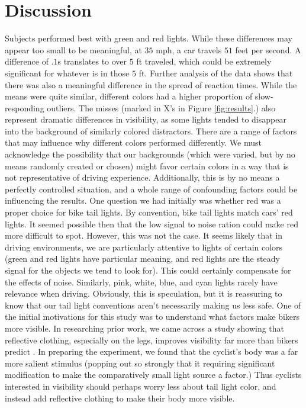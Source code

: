 \section{Discussion}

Subjects performed best with green and red lights. While these differences may
appear too small to be meaningful, at $35$ mph, a car travels $51$ feet per
second. A difference of $.1$s translates to over $5$ ft traveled, which could
be extremely significant for whatever is in those $5$ ft.  Further analysis of
the data shows that there was also a meaningful difference in the spread of
reaction times. While the means were quite similar, different colors had a
higher proportion of slow-responding outliers. The misses (marked in X's in
Figure \ref{fig:results}.) also represent dramatic differences in visibility,
as some lights tended to disappear into the background of similarly colored
distractors.  There are a range of factors that may influence why different
colors performed differently. We must acknowledge the possibility that our
backgrounds (which were varied, but by no means randomly created or chosen)
might favor certain colors in a way that is not representative of driving
experience. Additionally, this is by no means a perfectly controlled situation,
and a whole range of confounding factors could be influencing the results.  One
question we had initially was whether red was a proper choice for bike tail
lights. By convention, bike tail lights match cars' red lights. It seemed
possible then that the low signal to noise ration could make red more difficult
to spot. However, this was not the case. It seems likely that in driving
environments, we are particularly attentive to lights of certain colors (green
and red lights have particular meaning, and red lights are the steady signal
for the objects we tend to look for). This could certainly compensate for the
effects of noise. Similarly, pink, white, blue, and cyan lights rarely have
relevance when driving. Obviously, this is speculation, but it is reassuring to
know that our tail light conventions aren't necessarily making us less safe.
One of the initial motivations for this study was to understand what factors
make bikers more visible. In researching prior work, we came across a study
showing that reflective clothing, especially on the legs, improves visibility
far more than bikers predict \cite{wood2013bicyclists}. In preparing the
experiment, we found that the cyclist's body was a far more salient stimulus
(popping out so strongly that it requiring significant modification to make the
comparatively small light source a factor.) Thus cyclists interested in
visibility should perhaps worry less about tail light color, and instead add
reflective clothing to make their body more visible.

